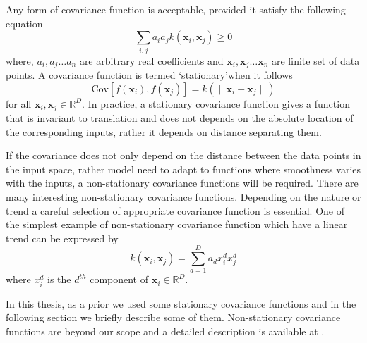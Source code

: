 Any form of covariance function is acceptable, provided it satisfy the following equation
\begin{equation} \label{eq:cov_basic}
\sum_{i,j} a_i a_j k\left(\textbf{x}_i,\textbf{x}_j\right)\geq 0
\end{equation}
where, $a_i, a_j \dots a_n$ are arbitrary real coefficients and $\textbf{x}_i, \textbf{x}_j \dots \textbf{x}_n$ are finite set of data points. A covariance function is termed \lq stationary\rq when it follows
\begin{equation} \label{eq:cov_stationary}
\text{Cov}\left[f\left(\textbf{x}_i\right),f\left(\textbf{x}_j\right)\right] = k\left( \lVert \textbf{x}_i -\textbf{x}_j \rVert \right)
\end{equation}
for all $\textbf{x}_i,\textbf{x}_j \in \mathbb{R}^D$. In practice, a stationary covariance function  gives a function that is invariant to translation and does not depends on the absolute location of the corresponding inputs, rather it depends on distance separating them. 

If the covariance does not only depend on the distance between the data points in the input space, rather model need to adapt to functions where smoothness varies with the inputs, a non-stationary covariance functions will be required. There are many interesting non-stationary covariance functions. Depending on the nature or trend a careful selection of appropriate covariance function is essential. One of the simplest example of non-stationary covariance function which have a linear trend can be expressed by 
\begin{equation} \label{eq:cov_nonStationary}
k\left( \textbf{x}_i, \textbf{x}_j \right) = \sum_{d=1}^{D} a_d x_i^d x_j^d
\end{equation}
where $x_i^d$ is the $d^{th}$ component of $\textbf{x}_i \in \mathbb{R}^D$. 

In this thesis, as a prior we used some stationary covariance functions and in the following section we briefly describe some of them. Non-stationary covariance functions are beyond our scope and a detailed description is available at \cite{Rasmussen_and_Williams:2006}.

